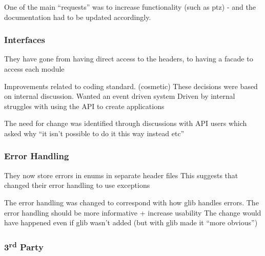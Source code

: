 \documentclass[conference]{IEEEtran}
\begin{document}
One of the main “requests” was to increase functionality (such as ptz) - and the documentation had to be updated accordingly.










\subsubsection{Interfaces}

They have gone from having direct access to the headers, to having a facade to access each module



Improvements related to coding standard. (cosmetic)
These decisions were based on internal discussion.
Wanted an event driven system
Driven by internal struggles with using the API to create applications

The need for change was identified through discussions with API users which asked why “it isn’t possible to do it this way instead etc”








\subsubsection{Error Handling}

They now store errors in enums in separate header files
This suggests that changed their error handling to use exceptions




The error handling was changed to correspond with how glib handles errors. 
The error handling should be more informative + increase usability
The change would have happened even if glib wasn’t added (but with glib made it “more obvious”)










\subsubsection{3\textsuperscript{rd} Party}
\end{document}
